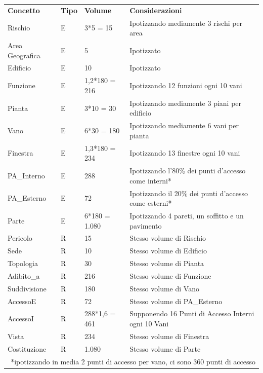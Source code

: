 \documentclass[12pt,a4paper]{report}
\begin{document}
\begin{center}
            \begin{tabular}{|p{4cm}|p{1cm}|p{3cm}|p{8cm}|}
                \hline
                \rowcolor{giallo}\multicolumn{4}{|c|}{\textbf{Area Generale}} \\ \hline
                \textbf{Concetto} & \textbf{Tipo} & \textbf{Volume} & \textbf{Considerazioni} \\ \hline
                Rischio & E & 3*5 = 15 & Ipotizzando mediamente 3 rischi per area \\ \hline
                Area Geografica & E & 5 & Ipotizzato \\ \hline
                Edificio & E & 10 & Ipotizzato \\ \hline
                Funzione & E & 1,2*180 = 216 & Ipotizzando 12 funzioni ogni 10 vani \\ \hline
                Pianta & E & 3*10 = 30  & Ipotizzando mediamente 3 piani per edificio \\ \hline
                Vano & E & 6*30 = 180 & Ipotizzando mediamente 6 vani per pianta \\ \hline
                Finestra & E & 1,3*180  = 234 & Ipotizzando 13 finestre ogni 10 vani \\ \hline
                PA\_Interno & E & 288 & Ipotizzando l'80\% dei punti d'accesso come interni* \\ \hline
                PA\_Esterno & E & 72 & Ipotizzando il 20\% dei punti d'accesso come esterni* \\ \hline
                Parte & E & 6*180 = 1.080 & Ipotizzando 4 pareti, un soffitto e un pavimento \\ \hline
                Pericolo & R & 15 & Stesso volume di Rischio \\ \hline
                Sede & R & 10 & Stesso volume di Edificio \\ \hline
                Topologia & R & 30 & Stesso volume di Pianta \\ \hline
                Adibito\_a & R & 216 & Stesso volume di Funzione \\ \hline
                Suddivisione & R & 180 & Stesso volume di Vano \\ \hline
                AccessoE & R & 72 & Stesso volume di PA\_Esterno \\ \hline
                AccessoI & R & 288*1,6 = 461 & Supponendo 16 Punti di Accesso Interni ogni 10 Vani \\ \hline
                Vista & R & 234 & Stesso volume di Finestra \\ \hline
                Costituzione & R & 1.080 & Stesso volume di Parte \\ \hline
                \multicolumn{4}{|r|}{*ipotizzando in media 2 punti di accesso per vano, ci sono 360 punti di accesso} \\ \hline
            \end{tabular}
            

\end{center}
\end{document}
